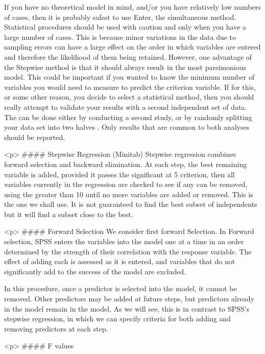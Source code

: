 If you have no theoretical model in mind, and/or you have relatively low numbers
of cases, then it is probably safest to use Enter, the simultaneous method. Statistical
procedures should be used with caution and only when you have a large number of
cases. This is because minor variations in the data due to sampling errors can have a
large effect on the order in which variables are entered and therefore the likelihood
of them being retained. However, one advantage of the Stepwise method is that it
should always result in the most parsimonious model. This could be important if
you wanted to know the minimum number of variables you would need to measure
to predict the criterion variable. If for this, or some other reason, you decide to
select a statistical method, then you should really attempt to validate your results
with a second independent set of data. The can be done either by conducting a
second study, or by randomly splitting your data set into two halves . Only results that are common to both analyses should be reported.

<p>
#### {Stepwise Regression (Minitab)}
Stepwise regression combines forward selection and backward elimination. At each
step, the best remaining variable is added, provided it passes the significant at 5%
criterion, then all variables currently in the regression are checked to see if any can be
removed, using the greater than 10%
until no more variables are added or removed. This is the one we shall use. It is not
guaranteed to find the best subset of independents but it will find a subset close to the
best.


<p>
#### {Forward Selection}
We consider first forward Selection. In Forward selection, SPSS enters the variables into the model one at a time in an
order determined by the strength of their correlation with the response variable. The effect of adding each is assessed as it is entered, and variables that do not significantly add to the success of the model are excluded.

In this procedure, once a predictor is selected into the model, it cannot be removed. Other predictors may be added at future steps, but predictors already in the model remain in the model. As we will see, this is in contrast to SPSS's stepwise regression, in which we can specify criteria for both adding and removing predictors at each step.






<p>
#### {F values}

